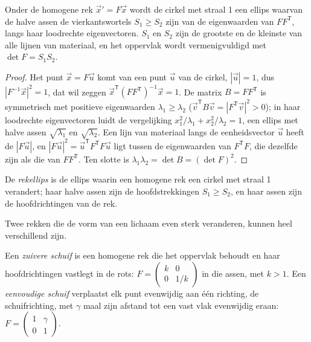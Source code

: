\begin{proposition}[De rekellips]\label{prop:b1:stress-strain-rheology:ellipse}
Onder de homogene rek $\vec x' = F\vec x$ wordt de cirkel met straal 1 een ellips waarvan de halve assen de vierkantswortels $S_1 \ge S_2$ zijn van de eigenwaarden van $FF^{\mathsf T}$, langs haar loodrechte eigenvectoren. $S_1$ en $S_2$ zijn de grootste en de kleinste  van alle lijnen van materiaal, en het oppervlak wordt vermenigvuldigd met $\det F = S_1S_2$.
\end{proposition}

\begin{proof}
Het punt $\vec x = F\vec u$ komt van een punt $\vec u$ van de cirkel, $|\vec u| = 1$, dus $|F^{-1}\vec x|^2 = 1$, dat wil zeggen $\vec x^{\mathsf T}(FF^{\mathsf T})^{-1}\vec x = 1$. De matrix $B = FF^{\mathsf T}$ is symmetrisch met positieve eigenwaarden $\lambda_1 \ge
\lambda_2$ ($\vec v^{\mathsf T}B\vec v = |F^{\mathsf T}\vec v|^2 > 0$); in haar loodrechte eigenvectoren luidt de vergelijking $x_1^2/\lambda_1 + x_2^2/\lambda_2 = 1$, een ellips met halve assen $\sqrt{\lambda_1}$ en $\sqrt{\lambda_2}$. Een lijn van materiaal langs de eenheidsvector $\vec u$ heeft de  $|F\vec u|$, en $|F\vec u|^2 = \vec u^{\mathsf T}F^{\mathsf T}F\vec u$ ligt tussen de eigenwaarden van $F^{\mathsf T}F$, die dezelfde zijn als die van $FF^{\mathsf T}$. Ten slotte is $\lambda_1\lambda_2 = \det B = (\det F)^2$.
\end{proof}

\begin{definition}[Rekellips]\label{def:b1:stress-strain-rheology:strain-ellipse}
De \emph{rekellips} is de ellips waarin een homogene rek een cirkel met straal 1 verandert; haar halve assen zijn de hoofdstrekkingen $S_1 \ge S_2$, en haar assen zijn de hoofdrichtingen van de rek.
\end{definition}

Twee rekken die de vorm van een lichaam even sterk veranderen, kunnen heel verschillend zijn.

\begin{definition}\label{def:b1:stress-strain-rheology:shear-types}
Een \emph{zuivere schuif} is een homogene rek die het oppervlak behoudt en haar hoofdrichtingen vastlegt in de rots: $F = \begin{pmatrix} k & 0 \\ 0 & 1/k\end{pmatrix}$ in die assen, met $k > 1$. Een \emph{eenvoudige schuif} verplaatst elk punt evenwijdig aan één richting, de schuifrichting, met $\gamma$ maal zijn afstand tot een vast vlak evenwijdig eraan: $F = \begin{pmatrix} 1 & \gamma \\ 0 & 1\end{pmatrix}$.
\end{definition}

